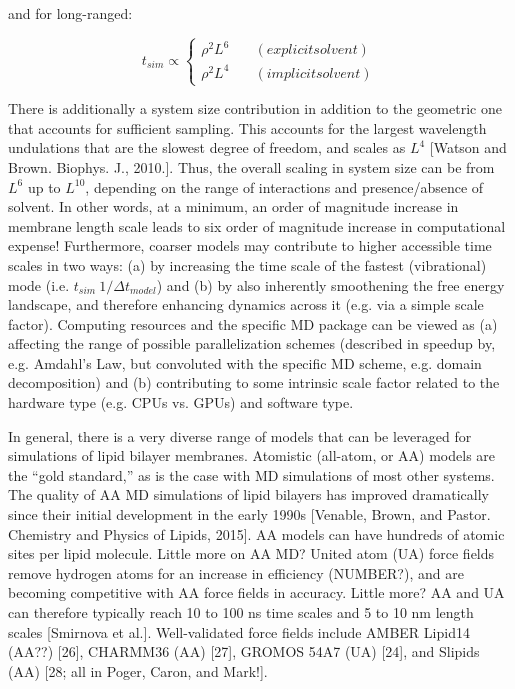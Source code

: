 \documentclass[9pt,bestpractices]{livecoms}
\begin{document}
and for long-ranged:

\begin{equation}
	\label{e:partition}
	t_{sim} \propto \left\{
       		 \begin{array}{ll}
            		\rho^2 L^6 & \quad (explicit solvent) \\
            		\rho^2 L^4 & \quad (implicit solvent)
        		\end{array}
    	\right.
\end{equation}

There is additionally a system size contribution in addition to the geometric one that accounts for sufficient sampling.
This accounts for the largest wavelength undulations that are the slowest degree of freedom, and scales as $L^4$ [Watson and Brown. Biophys. J., 2010.].
Thus, the overall scaling in system size can be from $L^6$ up to $L^10$, depending on the range of interactions and presence/absence of solvent.
In other words, at a minimum, an order of magnitude increase in membrane length scale leads to six order of magnitude increase in computational expense!
Furthermore, coarser models may contribute to higher accessible time scales in two ways: (a) by increasing the time scale of the fastest (vibrational) mode (i.e. $t_{sim} ~ 1/\Delta t_{model}$) and (b) by also inherently smoothening the free energy landscape, and therefore enhancing dynamics across it (e.g. via a simple scale factor).
Computing resources and the specific MD package can be viewed as (a) affecting the range of possible parallelization schemes (described in speedup by, e.g. Amdahl's Law, but convoluted with the specific MD scheme, e.g. domain decomposition) and (b) contributing to some intrinsic scale factor related to the hardware type (e.g. CPUs vs. GPUs) and software type.

In general, there is a very diverse range of models that can be leveraged for simulations of lipid bilayer membranes.
Atomistic (all-atom, or AA) models are the ``gold standard,'' as is the case with MD simulations of most other systems.
The quality of AA MD simulations of lipid bilayers has improved dramatically since their initial development in the early 1990s [Venable, Brown, and Pastor. Chemistry and Physics of Lipids, 2015].
AA models can have hundreds of atomic sites per lipid molecule.
Little more on AA MD?
United atom (UA) force fields remove hydrogen atoms for an increase in efficiency (NUMBER?), and are becoming competitive with AA force fields in accuracy.
Little more?
AA and UA can therefore typically reach 10 to 100 ns time scales and 5 to 10 nm length scales [Smirnova et al.].
Well-validated force fields include AMBER Lipid14 (AA??) [26], CHARMM36 (AA) [27], GROMOS 54A7 (UA) [24], and Slipids (AA) [28; all in Poger, Caron, and Mark!].
\end{document}
